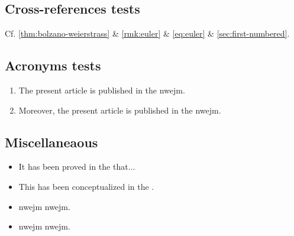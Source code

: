 \documentclass[
]{nwejmart}
\begin{document}
\subsection{Cross-references tests}
%
Cf. \vref{thm:bolzano-weierstrass} \& \vref{rmk:euler} \&
\vref{eq:euler} \& \vref{sec:first-numbered}.
%
\subsection{Acronyms tests}
%
\begin{enumerate}
\item The present article is published in the \gls{nwejm}.
\item Moreover, the present article is published in the \gls{nwejm}.
\end{enumerate}
%
\subsection{Miscellaneaous}
%
\begin{itemize}
\item It has been proved in the  
  that...
\item This has been conceptualized in the  .
\item \acrshort{nwejm} \ie{} \acrlong*{nwejm}.
\item \acrshort{nwejm} \ie*{} \acrlong*{nwejm}.
\end{itemize}
%
\end{document}
